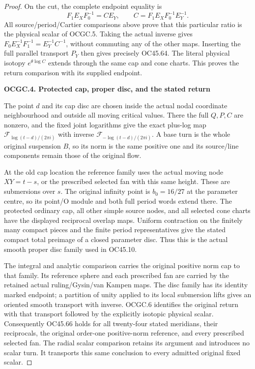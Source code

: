 \begin{proof}
On the cut, the complete endpoint equality is
\[
F_1E_XF_0^{-1}=CE_Y,
\qquad C=F_1E_XF_0^{-1}E_Y^{-1}.
\tag{OCGC.6}
\]
All source/period/Cartier comparisons above prove that this particular
ratio is the physical scalar of OCGC.5. Taking the actual inverse
gives \(F_0E_X^{-1}F_1^{-1}=E_Y^{-1}C^{-1}\), without commuting any
of the other maps. Inserting the full parallel transport \(P_Y\)
then gives precisely OC45.64. The literal physical isotopy
\(e^{\theta\log C}\) extends through the same cap and cone charts.
This proves the return comparison with its supplied endpoint.

\par

\medskip\noindent\textbf{OCGC.4. Protected cap, proper disc, and the stated return}

\par\nobreak

The point \(d\) and its cap disc are chosen inside the actual nodal
coordinate neighbourhood and outside all moving critical values.
There the full \(Q,P,C\) are nonzero, and the fixed joint logarithms
give the exact plus-log map \(\mathcal F_{\log(t-d)/(2\pi i)}\)
with inverse \(\mathcal F_{-\log(t-d)/(2\pi i)}\). A base turn is the
whole original suspension \(B\), so its norm is the same positive
one and its source/line components remain those of the original flow.

At the old cap location the reference family uses the actual moving
node \(XY=t-s\), or the prescribed selected fan with this same
height. These are submersions over \(s\). The original infinity
point is \(b_0=16/27\) at the parameter centre, so its point/O module
and both full period words extend there. The protected ordinary cap,
all other simple source nodes, and all selected cone charts have the
displayed reciprocal overlap maps. Uniform contraction on the finitely
many compact pieces and the finite period representatives give the
stated compact total preimage of a closed parameter disc. Thus this
is the actual smooth proper disc family used in OC45.10.

The integral and analytic comparison carries the original positive
norm cap to that family. Its reference sphere and each prescribed
fan are carried by the retained actual ruling/Gysin/van Kampen maps.
The disc family has its identity marked endpoint; a partition of
unity applied to its local submersion lifts gives an oriented smooth
transport with inverse. OCGC.6 identifies the original return with
that transport followed by the explicitly isotopic physical scalar.
Consequently OC45.66 holds for all twenty-four stated meridians,
their reciprocals, the original order-one positive-norm reference,
and every prescribed selected fan. The radial scalar comparison
retains its argument and introduces no scalar turn. It transports
this same conclusion to every admitted original fixed scalar.


\end{proof}
